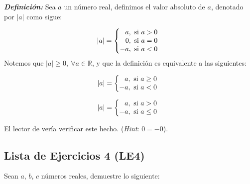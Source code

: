 \documentclass[11pt]{article}
\newcommand{\R}{\mathbb{R}}
\newcommand{\bfit}[1]{\textbf{\textit{#1}}}
\begin{document}
\bfit{Definición:}  Sea $a$ un número real, definimos el valor absoluto de $a$, denotado por $|a|$ como sigue:

    \[
        |a| = \left\{
    \begin{array}{@{}r@{\thinspace}l}
        a, &  \ \text{si}  \ a>0\\
        0, &  \ \text{si}  \ a=0\\
        -a, & \  \text{si} \  a<0
    \end{array} \right. \]
Notemos que $|a|\geq 0, \ \forall a\in \R$, y que la definición es equivalente a las siguientes:

\begin{center}
\begin{minipage}[c]{.3\linewidth}
    \[|a| = \left\{
        \begin{array}{@{}r@{\thinspace}l}
            a, & \ \text{si} \ a\geq 0\\
            -a, & \ \text{si} \ a<0
        \end{array} \right.\]
    \end{minipage}%
\begin{minipage}[c]{.3\linewidth}
    \[|a| = \left\{
        \begin{array}{@{}r@{\thinspace}l}
            a, & \ \text{si} \ a>0\\
            -a, & \ \text{si} \ a\leq 0
        \end{array} \right.\]
\end{minipage}
\end{center}

El lector de vería verificar este hecho. (\textit{Hint}: $0=-0$).

\subsection*{Lista de Ejercicios 4 (LE4)}

Sean $a$, $b$, $c$ números reales, demuestre lo siguiente:
\end{document}

